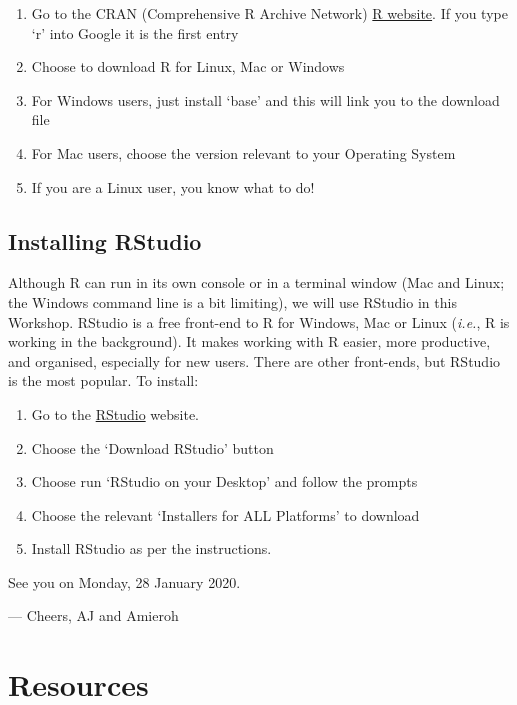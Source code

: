 \documentclass[
]{book}
\begin{document}
\begin{enumerate}
\def\labelenumi{\arabic{enumi}.}
\item
  Go to the CRAN (Comprehensive R Archive Network) \href{http://cran.r-project.org}{R website}. If you type `r' into Google it is the first entry
\item
  Choose to download R for Linux, Mac or Windows
\item
  For Windows users, just install `base' and this will link you to the download file
\item
  For Mac users, choose the version relevant to your Operating System
\item
  If you are a Linux user, you know what to do!
\end{enumerate}

\hypertarget{installing-rstudio}{%
\subsection{Installing RStudio}\label{installing-rstudio}}

Although R can run in its own console or in a terminal window (Mac and Linux; the Windows command line is a bit limiting), we will use RStudio in this Workshop. RStudio is a free front-end to R for Windows, Mac or Linux (\emph{i.e.}, R is working in the background). It makes working with R easier, more productive, and organised, especially for new users. There are other front-ends, but RStudio is the most popular. To install:

\begin{enumerate}
\def\labelenumi{\arabic{enumi}.}
\item
  Go to the \href{http://www.rstudio.com}{RStudio} website.
\item
  Choose the `Download RStudio' button
\item
  Choose run `RStudio on your Desktop' and follow the prompts
\item
  Choose the relevant `Installers for ALL Platforms' to download
\item
  Install RStudio as per the instructions.
\end{enumerate}

See you on Monday, 28 January 2020.

--- Cheers, AJ and Amieroh

\hypertarget{resources}{%
\section{Resources}\label{resources}}
\end{document}
